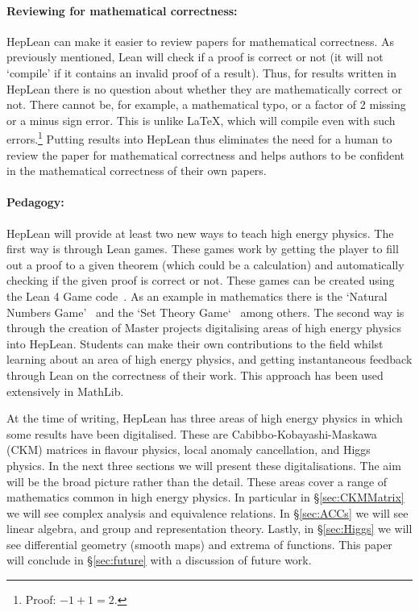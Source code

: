 \documentclass[a4paper, 11pt]{article}
\begin{document}
\paragraph{Reviewing for mathematical correctness:}
  
HepLean can make it easier to review papers for
mathematical correctness. As previously mentioned,  Lean will check if a proof is correct or not (it
will not `compile' if it contains an invalid proof of a result). Thus, for results written in HepLean
there is no question about whether they are mathematically correct or not. There cannot be, for
example, a mathematical typo, or a factor of 2 missing or a minus sign error. This is unlike LaTeX,
which will compile even with such errors.\footnote{ Proof: $-1+1=2$.} Putting results into HepLean
thus eliminates the need for a human to review the paper for mathematical correctness and helps
authors to be confident in the mathematical correctness of their own papers.
 
 
\paragraph{Pedagogy:}
 HepLean will provide at least two new
ways to teach high energy physics.  The first way is through Lean games. These games work by getting
the player to fill out a proof to a given theorem (which could be a calculation) and automatically
checking if the given proof is correct or not. These games can be created using the Lean 4 Game
code~\cite{LGS}. As an example in mathematics there is the  `Natural Numbers Game'~\cite{NNG} and
the `Set Theory Game`~\cite{STG} among others. The second way is through the creation of 
Master projects digitalising areas of high energy physics into HepLean. Students can make their own contributions to the field whilst learning about an area of high energy physics, and getting
instantaneous feedback through Lean on the correctness of their work. This approach has been used
extensively in MathLib.  

At the time of writing, HepLean has three areas of
high energy physics in which some results have been digitalised. These are
Cabibbo-Kobayashi-Maskawa (CKM) matrices in flavour physics, local anomaly cancellation, and Higgs
physics. In the next three sections we will present these digitalisations. The aim will be the broad
picture rather than the detail. These areas cover a range of mathematics common in high energy physics.
In particular in \S\ref{sec:CKMMatrix} we will see complex analysis and equivalence relations. In
\S\ref{sec:ACCs} we will see linear algebra, and group and representation theory. Lastly, in
\S\ref{sec:Higgs} we will see differential geometry (smooth maps) and extrema of functions. This
paper will conclude in \S\ref{sec:future} with a discussion of future work. 
\end{document}
